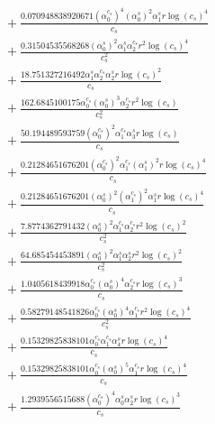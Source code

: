\documentclass[10pt]{article}
\begin{document}
\begin{align*}
&{}  + \frac{0.070948838920671 \left(\alpha_{0}^{c_s}\right)^{4} \left(\alpha_{0}^s\right)^{2} \alpha_{1}^s r \log{\left(c_{s} \right)}^{4}}{c_{s}} \\
&{}  + \frac{0.31504535568268 \left(\alpha_{0}^s\right)^{2} \alpha_{1}^s \alpha_{2}^{c_s} r^{2} \log{\left(c_{s} \right)}^{4}}{c_{s}^{2}} \\
&{}  + \frac{18.751327216492 \alpha_{1}^s \alpha_{2}^{c_s} \alpha_{2}^s r \log{\left(c_{s} \right)}^{2}}{c_{s}} \\
&{}  + \frac{162.6845100175 \alpha_{0}^{c_s} \left(\alpha_{0}^s\right)^{3} \alpha_{2}^{c_s} r^{2} \log{\left(c_{s} \right)}}{c_{s}^{2}} \\
&{}  + \frac{50.194489593759 \left(\alpha_{0}^{c_s}\right)^{2} \alpha_{1}^{c_s} \alpha_{3}^s r \log{\left(c_{s} \right)}}{c_{s}} \\
&{}  + \frac{0.21284651676201 \left(\alpha_{0}^{c_s}\right)^{2} \alpha_{1}^{c_s} \left(\alpha_{1}^s\right)^{2} r \log{\left(c_{s} \right)}^{4}}{c_{s}} \\
&{}  + \frac{0.21284651676201 \left(\alpha_{0}^s\right)^{2} \left(\alpha_{1}^{c_s}\right)^{2} \alpha_{1}^s r \log{\left(c_{s} \right)}^{4}}{c_{s}} \\
&{}  + \frac{7.8774362791432 \left(\alpha_{0}^s\right)^{2} \alpha_{1}^{c_s} \alpha_{2}^{c_s} r^{2} \log{\left(c_{s} \right)}^{2}}{c_{s}^{2}} \\
&{}  + \frac{64.685454453891 \left(\alpha_{0}^s\right)^{2} \alpha_{1}^s \alpha_{2}^s r^{2} \log{\left(c_{s} \right)}^{2}}{c_{s}^{2}} \\
&{}  + \frac{1.0405618439918 \alpha_{0}^{c_s} \left(\alpha_{0}^s\right)^{4} \alpha_{2}^{c_s} r \log{\left(c_{s} \right)}^{3}}{c_{s}} \\
&{}  + \frac{0.58279148541826 \alpha_{0}^{c_s} \left(\alpha_{0}^s\right)^{4} \alpha_{1}^{c_s} r^{2} \log{\left(c_{s} \right)}^{4}}{c_{s}^{2}} \\
&{}  + \frac{0.15329825838101 \alpha_{0}^{c_s} \alpha_{1}^{c_s} \alpha_{4}^s r \log{\left(c_{s} \right)}^{4}}{c_{s}} \\
&{}  + \frac{0.15329825838101 \alpha_{0}^{c_s} \left(\alpha_{0}^s\right)^{5} \alpha_{1}^{c_s} r \log{\left(c_{s} \right)}^{4}}{c_{s}} \\
&{}  + \frac{1.2939556515688 \left(\alpha_{0}^{c_s}\right)^{4} \alpha_{0}^s \alpha_{2}^s r \log{\left(c_{s} \right)}^{3}}{c_{s}}
\end{align*}
\end{document}
